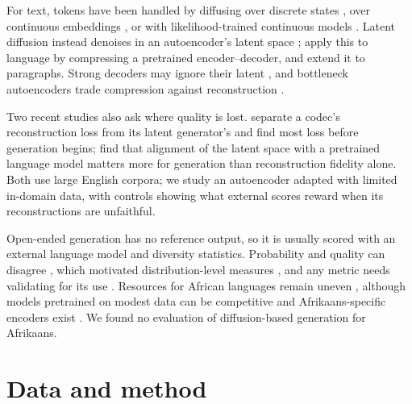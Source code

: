 \documentclass[11pt,a4paper]{article}
\begin{document}
For text, tokens have been handled by diffusing over discrete states \citep{austin2021structured}, over continuous embeddings \citep{li2022diffusionlm,gong2023diffuseq,strudel2022self,dieleman2022continuous}, or with likelihood-trained continuous models \citep{gulrajani2023likelihood}. Latent diffusion instead denoises in an autoencoder's latent space \citep{rombach2022high}; \citet{lovelace2023latent} apply this to language by compressing a pretrained encoder--decoder, and \citet{zhang2023planner} extend it to paragraphs. Strong decoders may ignore their latent \citep{bowman2016generating,li2020optimus}, and bottleneck autoencoders trade compression against reconstruction \citep{montero2021sentence}.

Two recent studies also ask where quality is lost. \citet{gavrilov2026where} separate a codec's reconstruction loss from its latent generator's and find most loss before generation begins; \citet{jiang2026textldm} find that alignment of the latent space with a pretrained language model matters more for generation than reconstruction fidelity alone. Both use large English corpora; we study an autoencoder adapted with limited in-domain data, with controls showing what external scores reward when its reconstructions are unfaithful.

Open-ended generation has no reference output, so it is usually scored with an external language model and diversity statistics. Probability and quality can disagree \citep{holtzman2020curious,meister2020beam}, which motivated distribution-level measures \citep{pillutla2021mauve}, and any metric needs validating for its use \citep{reiter2018structured}. Resources for African languages remain uneven \citep{joshi2020state,nekoto2020participatory}, although models pretrained on modest data can be competitive \citep{ogueji2021small,adebara2023serengeti} and Afrikaans-specific encoders exist \citep{ralethe2020adaptation}. We found no evaluation of diffusion-based generation for Afrikaans.

\section{Data and method}
\label{sec:method}
\end{document}
